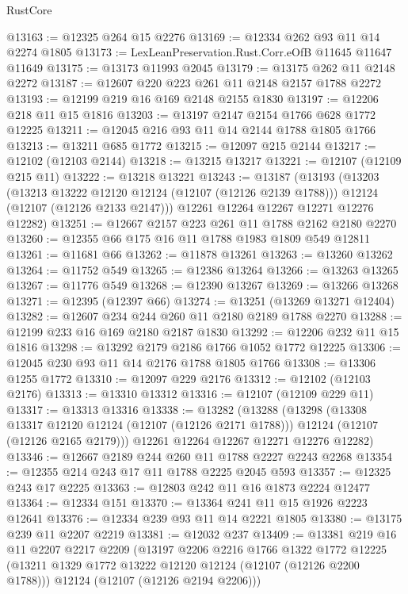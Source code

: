 \begin{lexlean}{RustCore}
\begin{coremodule}
@13163 := @12325 @264 @15 @2276
@13169 := @12334 @262 @93 @11 @14 @2274 @1805
@13173 := LexLeanPreservation.Rust.Corr.eOfB @11645 @11647 @11649
@13175 := @13173 @11993 @2045
@13179 := @13175 @262 @11 @2148 @2272
@13187 := @12607 @220 @223 @261 @11 @2148 @2157 @1788 @2272
@13193 := @12199 @219 @16 @169 @2148 @2155 @1830
@13197 := @12206 @218 @11 @15 @1816
@13203 := @13197 @2147 @2154 @1766 @628 @1772 @12225
@13211 := @12045 @216 @93 @11 @14 @2144 @1788 @1805 @1766
@13213 := @13211 @685 @1772
@13215 := @12097 @215 @2144
@13217 := @12102 (@12103 @2144)
@13218 := @13215 @13217
@13221 := @12107 (@12109 @215 @11)
@13222 := @13218 @13221
@13243 := @13187
    (@13193
      (@13203
        (@13213 @13222 @12120 @12124 (@12107 (@12126 @2139 @1788)))
        @12124
        (@12107 (@12126 @2133 @2147)))
      @12261
      @12264
      @12267
      @12271
      @12276
      @12282)
@13251 := @12667 @2157 @223 @261 @11 @1788 @2162 @2180 @2270
@13260 := @12355 @66 @175 @16 @11 @1788 @1983 @1809 @549 @12811
@13261 := @11681 @66
@13262 := @11878 @13261
@13263 := @13260 @13262
@13264 := @11752 @549
@13265 := @12386 @13264
@13266 := @13263 @13265
@13267 := @11776 @549
@13268 := @12390 @13267
@13269 := @13266 @13268
@13271 := @12395 (@12397 @66)
@13274 := @13251 (@13269 @13271 @12404)
@13282 := @12607 @234 @244 @260 @11 @2180 @2189 @1788 @2270
@13288 := @12199 @233 @16 @169 @2180 @2187 @1830
@13292 := @12206 @232 @11 @15 @1816
@13298 := @13292 @2179 @2186 @1766 @1052 @1772 @12225
@13306 := @12045 @230 @93 @11 @14 @2176 @1788 @1805 @1766
@13308 := @13306 @1255 @1772
@13310 := @12097 @229 @2176
@13312 := @12102 (@12103 @2176)
@13313 := @13310 @13312
@13316 := @12107 (@12109 @229 @11)
@13317 := @13313 @13316
@13338 := @13282
    (@13288
      (@13298
        (@13308 @13317 @12120 @12124 (@12107 (@12126 @2171 @1788)))
        @12124
        (@12107 (@12126 @2165 @2179)))
      @12261
      @12264
      @12267
      @12271
      @12276
      @12282)
@13346 := @12667 @2189 @244 @260 @11 @1788 @2227 @2243 @2268
@13354 := @12355 @214 @243 @17 @11 @1788 @2225 @2045 @593
@13357 := @12325 @243 @17 @2225
@13363 := @12803 @242 @11 @16 @1873 @2224 @12477
@13364 := @12334 @151
@13370 := @13364 @241 @11 @15 @1926 @2223 @12641
@13376 := @12334 @239 @93 @11 @14 @2221 @1805
@13380 := @13175 @239 @11 @2207 @2219
@13381 := @12032 @237
@13409 := @13381
    @219
    @16
    @11
    @2207
    @2217
    @2209
    (@13197
      @2206
      @2216
      @1766
      @1322
      @1772
      @12225
      (@13211 @1329 @1772 @13222 @12120 @12124 (@12107 (@12126 @2200 @1788)))
      @12124
      (@12107 (@12126 @2194 @2206)))

\end{coremodule}
\end{lexlean}
